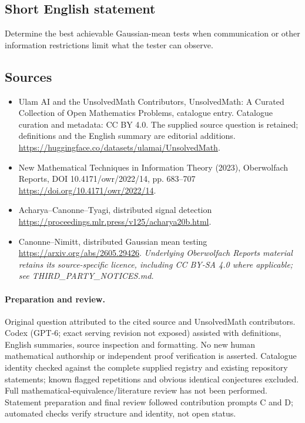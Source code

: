 \documentclass[11pt]{article}
\begin{document}
\subsection{Short English statement}
Determine the best achievable Gaussian-mean tests when communication or other information restrictions limit what the tester can observe.
\subsection{Sources}
\begin{itemize}
\item[\hypertarget{source:statement:1}{S1}] Ulam AI and the UnsolvedMath Contributors, UnsolvedMath: A Curated Collection of Open Mathematics Problems, catalogue entry. Catalogue curation and metadata: CC BY 4.0. The supplied source question is retained; definitions and the English summary are editorial additions.
\url{https://huggingface.co/datasets/ulamai/UnsolvedMath}.
\item[\hypertarget{source:statement:2}{S2}] New Mathematical Techniques in Information Theory (2023), Oberwolfach Reports, DOI 10.4171/owr/2022/14, pp. 683--707
\url{https://doi.org/10.4171/owr/2022/14}.
\item[\hypertarget{source:statement:3}{S3}] Acharya--Canonne--Tyagi, distributed signal detection
\url{https://proceedings.mlr.press/v125/acharya20b.html}.
\item[\hypertarget{source:statement:4}{S4}] Canonne--Nimitt, distributed Gaussian mean testing
\url{https://arxiv.org/abs/2605.29426}.
\textit{Underlying Oberwolfach Reports material retains its source-specific licence, including CC BY-SA 4.0 where applicable; see THIRD\_PARTY\_NOTICES.md.}
\end{itemize}
\paragraph{Preparation and review.}
Original question attributed to the cited source and UnsolvedMath contributors. Codex (GPT-6; exact serving revision not exposed) assisted with definitions, English summaries, source inspection and formatting. No new human mathematical authorship or independent proof verification is asserted. Catalogue identity checked against the complete supplied registry and existing repository statements; known flagged repetitions and obvious identical conjectures excluded. Full mathematical-equivalence/literature review has not been performed. Statement preparation and final review followed contribution prompts C and D; automated checks verify structure and identity, not open status.
\label{end:statement}
\end{document}
